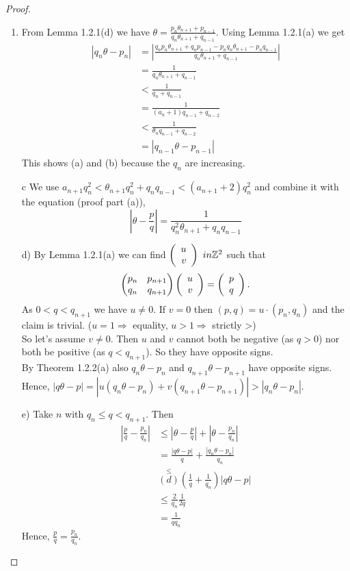 \documentclass[NumTh.tex]{subfiles}
\begin{document}
\begin{proof}
  \begin{enumerate}
    \item From Lemma 1.2.1(d) we have $\theta = \frac{p_n \theta_{n+1} + p_{n-1}}{q_n \theta_{n+1} + q_{n-1}}$.
    Using Lemma 1.2.1(a) we get
    \begin{align}
    |q_n \theta - p_n| &= |\frac{q_n p_n \theta_{n+1} + q_n p_{n-1} - p_n q_n \theta_{n+1} - p_n q_{n-1}}{q_n \theta_{n+1} + q_{n-1}}| \\
    &= \frac{1}{q_n \theta_{n+1} + q_{n-1}}\\
    &< \frac{1}{q_n + q_{n-1}}\\
    &= \frac{1}{(a_n +1) q_{n-1} + q_{n-2}}\\
    &< \frac{1}{\theta_n q_{n-1} + q_{n-2}}\\
    &= | q_{n-1} \theta - p_{n-1}|
    \end{align}
    This shows (a) and (b) because the $q_n$ are increasing.
    \item[c] We use $a_{n+1} q_n^2 < \theta_{n+1} q_n^2 + q_n q_{n-1} < (a_{n+1} + 2) q_n^2$
    and combine it with the equation (proof part (a)),
    \[ |\theta - \frac{p}{q}| = \frac{1}{q_n^2 \theta_{n+1} + q_n q_{n-1}} \]
    
    
    \item[d)] By Lemma 1.2.1(a) we can find $\Vek{u}{v}{} \ in \Z^2$ such that
    \[ \left(\begin{matrix} p_n & p_{n+1}\\ q_n & q_{n+1} \end{matrix} \right) \Vek{u}{v}{} = \Vek{p}{q}{}. \]
    As $0 < q <q_{n+1}$ we have $u \neq 0$. If $v = 0$ then $(p,q) = u \cdot (p_n,q_n)$ and the claim is trivial. ($u = 1 \Rightarrow$ equality, $u > 1 \Rightarrow$ strictly >)\\
    So let's assume $v \neq 0$. Then $u$ and $v$ cannot both be negative (as $q > 0$) nor both be positive (as $q < q_{n+1}$).
    So they have opposite signs.\\
    By Theorem 1.2.2(a) also $q_n\theta - p_n$ and $q_{n+1} \theta - p_{n+1}$ have opposite signs.
    Hence, $|q \theta - p| = |u (q_n \theta - p_n) + v (q_{n+1} \theta - p_{n+1})| > |q_n \theta - p_n|$.
    \item[e)] Take $n$ with $q_n \leq q < q_{n+1}$. Then 
    \begin{align*} 
    |\frac{p}{q} - \frac{p_n}{q_n}| &\leq |\theta - \frac{p}{q}| + |\theta - \frac{p_n}{q_n}| \\
    &= \frac{|q \theta - p|}{q} + \frac{|q_n \theta - p_n|}{q_n}\\
    &\overset{\leq}{(d)} (\frac{1}{q} + \frac{1}{q_n}) |q \theta - p | \\
    &\leq \frac{2}{q_n} \frac{1}{2q} \\
    &= \frac{1}{q q_n}
    \end{align*}
    Hence, $\frac{p}{q} = \frac{p_n}{q_n}$.
  \end{enumerate}
\end{proof}
\end{document}
